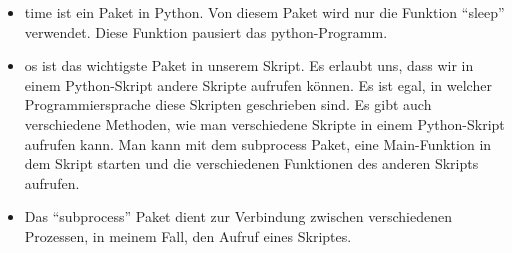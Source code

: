 \begin{enumerate}
\begin{itemize}
	 \item time ist ein Paket in Python. Von diesem Paket wird nur die Funktion ``sleep''  verwendet. Diese Funktion pausiert das python-Programm. \cite{timepackage}
	 
	 \item os ist das wichtigste Paket in unserem Skript. Es erlaubt uns, dass wir in einem Python-Skript andere Skripte aufrufen k\"onnen. Es ist egal, in welcher Programmiersprache diese Skripten geschrieben sind. Es gibt auch verschiedene Methoden, wie man verschiedene Skripte in einem Python-Skript aufrufen kann. Man kann mit dem subprocess Paket, eine Main-Funktion in dem Skript starten und die verschiedenen Funktionen des anderen Skripts aufrufen. 
	 
	 \item Das ``subprocess'' Paket dient zur Verbindung zwischen verschiedenen Prozessen, in meinem Fall, den Aufruf eines Skriptes.
	 

\end{itemize}
\end{enumerate}
